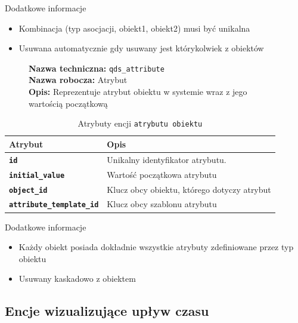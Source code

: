 Dodatkowe informacje
\begin{itemize}
    \item Kombinacja (typ asocjacji, obiekt1, obiekt2) musi być unikalna
    \item Usuwana automatycznie gdy usuwany jest którykolwiek z obiektów
\end{itemize}

\begin{figure}[H]
    \centering
    \begin{minipage}{0.8\textwidth}
        \begin{framed}
            \noindent\textbf{\large Nazwa techniczna:} \texttt{qds\_attribute} \\
            \textbf{\large Nazwa robocza:} Atrybut \\
            \textbf{\large Opis:} Reprezentuje atrybut obiektu w systemie wraz z jego wartością początkową
        \end{framed}
    \end{minipage}
\end{figure}

\begin{table}[H]
    \centering
    \renewcommand{\arraystretch}{1.6}
    \begin{tabular}{|>{\bfseries}l|p{}|}
        \hline
        \rowcolor[HTML]{EFEFEF} \textbf{Atrybut} & \textbf{Opis} \\
        \hline
        \texttt{id} & Unikalny identyfikator atrybutu. \\
        \hline
        \texttt{initial\_value} & Wartość początkowa atrybutu \\
        \hline
        \texttt{object\_id} & Klucz obcy obiektu, którego dotyczy atrybut \\
        \hline
        \texttt{attribute\_template\_id} & Klucz obcy szablonu atrybutu \\
        \hline
    \end{tabular}
    \caption{Atrybuty encji \texttt{atrybutu obiektu}}
\end{table}

Dodatkowe informacje
\begin{itemize}
    \item Każdy obiekt posiada dokładnie wszystkie atrybuty zdefiniowane przez typ obiektu
    \item Usuwany kaskadowo z obiektem
\end{itemize}

\subsection{Encje wizualizujące upływ czasu}

